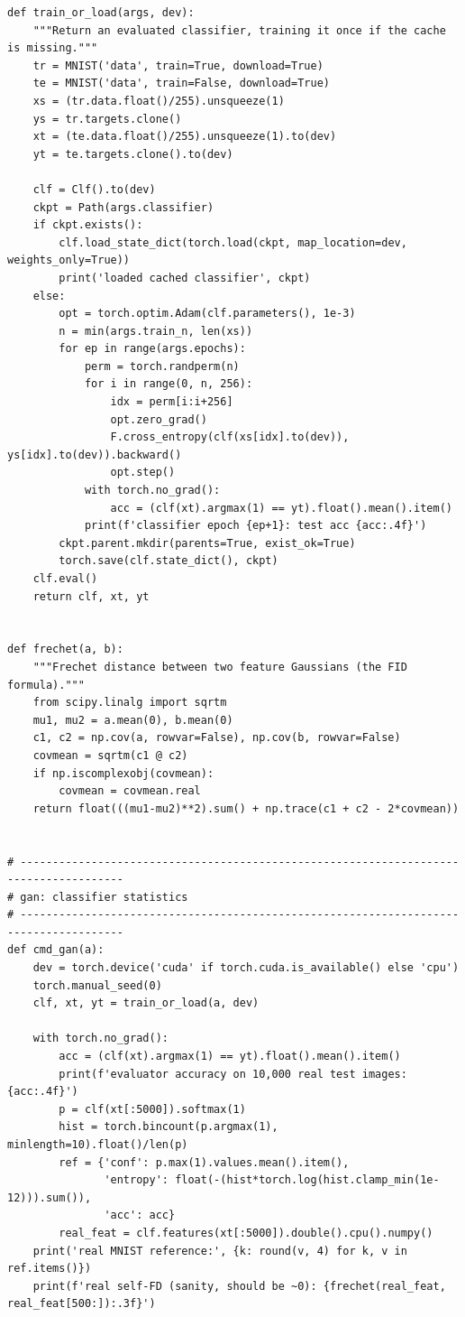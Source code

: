 \begin{lstlisting}
def train_or_load(args, dev):
    """Return an evaluated classifier, training it once if the cache is missing."""
    tr = MNIST('data', train=True, download=True)
    te = MNIST('data', train=False, download=True)
    xs = (tr.data.float()/255).unsqueeze(1)
    ys = tr.targets.clone()
    xt = (te.data.float()/255).unsqueeze(1).to(dev)
    yt = te.targets.clone().to(dev)

    clf = Clf().to(dev)
    ckpt = Path(args.classifier)
    if ckpt.exists():
        clf.load_state_dict(torch.load(ckpt, map_location=dev, weights_only=True))
        print('loaded cached classifier', ckpt)
    else:
        opt = torch.optim.Adam(clf.parameters(), 1e-3)
        n = min(args.train_n, len(xs))
        for ep in range(args.epochs):
            perm = torch.randperm(n)
            for i in range(0, n, 256):
                idx = perm[i:i+256]
                opt.zero_grad()
                F.cross_entropy(clf(xs[idx].to(dev)), ys[idx].to(dev)).backward()
                opt.step()
            with torch.no_grad():
                acc = (clf(xt).argmax(1) == yt).float().mean().item()
            print(f'classifier epoch {ep+1}: test acc {acc:.4f}')
        ckpt.parent.mkdir(parents=True, exist_ok=True)
        torch.save(clf.state_dict(), ckpt)
    clf.eval()
    return clf, xt, yt


def frechet(a, b):
    """Frechet distance between two feature Gaussians (the FID formula)."""
    from scipy.linalg import sqrtm
    mu1, mu2 = a.mean(0), b.mean(0)
    c1, c2 = np.cov(a, rowvar=False), np.cov(b, rowvar=False)
    covmean = sqrtm(c1 @ c2)
    if np.iscomplexobj(covmean):
        covmean = covmean.real
    return float(((mu1-mu2)**2).sum() + np.trace(c1 + c2 - 2*covmean))


# --------------------------------------------------------------------------------------
# gan: classifier statistics
# --------------------------------------------------------------------------------------
def cmd_gan(a):
    dev = torch.device('cuda' if torch.cuda.is_available() else 'cpu')
    torch.manual_seed(0)
    clf, xt, yt = train_or_load(a, dev)

    with torch.no_grad():
        acc = (clf(xt).argmax(1) == yt).float().mean().item()
        print(f'evaluator accuracy on 10,000 real test images: {acc:.4f}')
        p = clf(xt[:5000]).softmax(1)
        hist = torch.bincount(p.argmax(1), minlength=10).float()/len(p)
        ref = {'conf': p.max(1).values.mean().item(),
               'entropy': float(-(hist*torch.log(hist.clamp_min(1e-12))).sum()),
               'acc': acc}
        real_feat = clf.features(xt[:5000]).double().cpu().numpy()
    print('real MNIST reference:', {k: round(v, 4) for k, v in ref.items()})
    print(f'real self-FD (sanity, should be ~0): {frechet(real_feat, real_feat[500:]):.3f}')


\end{lstlisting}
